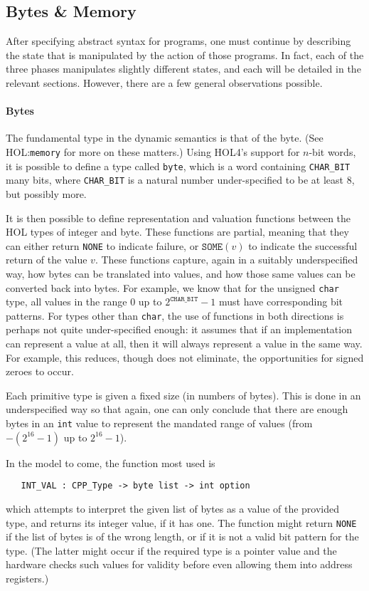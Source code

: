 \documentclass[11pt]{article}
\newcommand{\HOLfile}[1]{HOL:\texttt{#1}}
\begin{document}
\subsection{Bytes \& Memory}
\label{sec:bytes-memory-states}

After specifying abstract syntax for programs, one must continue by
describing the state that is manipulated by the action of those
programs.   In fact, each of the three phases manipulates slightly
different states, and each will be detailed in the relevant sections.
However, there are a few general observations possible.

\paragraph{Bytes} The fundamental type in the dynamic semantics is
that of the byte.  (See \HOLfile{memory} for more on these matters.)
Using HOL4's support for $n$-bit words, it is possible to define a
type called \texttt{byte}, which is a word containing
\texttt{CHAR_BIT} many bits, where \texttt{CHAR_BIT} is a natural
number under-specified to be at least 8, but possibly more.

It is then possible to define representation and valuation functions
between the HOL types of integer and byte.  These functions are
partial, meaning that they can either return \texttt{NONE} to indicate
failure, or $\texttt{SOME}(v)$ to indicate the successful return of
the value $v$.  These functions capture, again in a suitably
underspecified way, how bytes can be translated into values, and how
those same values can be converted back into bytes.  For example, we
know that for the unsigned \texttt{char} type, all values in the range
$0$ up to $2^{\texttt{CHAR_BIT}}-1$ must have corresponding bit
patterns.  For types other than \texttt{char}, the use of functions in
both directions is perhaps not quite under-specified enough: it
assumes that if an implementation can represent a value at all, then
it will always represent a value in the same way.  For example, this
reduces, though does not eliminate, the opportunities for signed
zeroes to occur.

Each primitive type is given a fixed size (in numbers of bytes).  This
is done in an underspecified way so that again, one can only conclude
that there are enough bytes in an \texttt{int} value to represent the
mandated range of values (from $-(2^{16} - 1)$ up to $2^{16} - 1$).

In the model to come, the function most used is
\begin{verbatim}
   INT_VAL : CPP_Type -> byte list -> int option
\end{verbatim}
which attempts to interpret the given list of bytes as a value of the
provided type, and returns its integer value, if it has one.  The
function might return \texttt{NONE} if the list of bytes is of the
wrong length, or if it is not a valid bit pattern for the type.  (The
latter might occur if the required type is a pointer value and the
hardware checks such values for validity before even allowing them
into address registers.)
\end{document}
